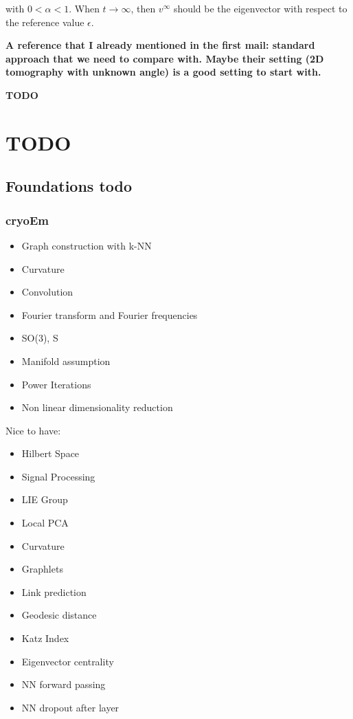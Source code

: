 with $0 < \alpha < 1$. When $t \rightarrow \infty$, then $v^{\infty}$ should be the 
eigenvector with respect to the reference value $\epsilon$.


\textbf{A reference that I already mentioned in the first mail:
standard approach that we need to compare with. 
Maybe their setting (2D tomography with unknown angle) is a good setting to start with.
}


\textbf{TODO}

\chapter{TODO}
\section{Foundations todo}

\subsection{cryoEm}


\begin{itemize}
    \item Graph construction with k-NN
    \item Curvature
    \item Convolution
    \item Fourier transform and Fourier frequencies
    \item SO(3), S
    \item Manifold assumption
    \item Power Iterations
    \item Non linear dimensionality reduction
\end{itemize}

Nice to have:
\begin{itemize}
    \item Hilbert Space
    \item Signal Processing    
    \item LIE Group
    \item Local PCA
    \item Curvature
    \item Graphlets
    \item Link prediction
    \item Geodesic distance
    \item Katz Index
    \item Eigenvector centrality
    \item NN forward passing
    \item NN dropout after layer
\end{itemize}

